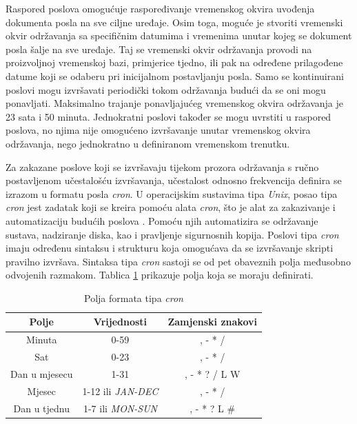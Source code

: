 Raspored poslova omogućuje raspoređivanje vremenskog okvira uvođenja dokumenta posla na sve ciljne uređaje. Osim toga, moguće je stvoriti vremenski okvir održavanja sa specifičnim datumima i vremenima unutar kojeg se dokument posla šalje na sve uređaje. Taj se vremenski okvir održavanja provodi na proizvoljnoj vremenskoj bazi, primjerice tjedno, ili pak na određene prilagođene datume koji se odaberu pri inicijalnom postavljanju posla. Samo se kontinuirani poslovi mogu izvršavati periodički tokom održavanja budući da se oni mogu ponavljati. Maksimalno trajanje ponavljajućeg vremenskog okvira održavanja je 23 sata i 50 minuta. Jednokratni poslovi također se mogu uvrstiti u raspored poslova, no njima nije omogućeno izvršavanje unutar vremenskog okvira održavanja, nego jednokratno u definiranom vremenskom trenutku. 

Za zakazane poslove koji se izvršavaju tijekom prozora održavanja s ručno postavljenom učestalošću izvršavanja, učestalost odnosno frekvencija definira se izrazom u formatu posla \textit{cron}. U operacijskim sustavima tipa \textit{Unix}, posao tipa \textit{cron} jest zadatak koji se kreira pomoću alata \textit{cron}, što je alat za zakazivanje i automatizaciju budućih poslova \cite{cron}. Pomoću njih automatizira se održavanje sustava, nadziranje diska, kao i pravljenje sigurnosnih kopija. Poslovi tipa \textit{cron} imaju određenu sintaksu i strukturu koja omogućava da se izvršavanje skripti pravilno izvršava. Sintaksa tipa \textit{cron} sastoji se od pet obaveznih polja međusobno odvojenih razmakom. Tablica \ref{table:cron} prikazuje polja koja se moraju definirati. 

\begin{table}[ht!]
	\centering
	\small
	\caption{Polja formata tipa \textit{cron} \cite{aws_docs}}
	\begin{tabular}{|c| c| c|}
		\hline
		\rowcolor{lightblue}  
		\textbf{Polje} & \textbf{Vrijednosti} & \textbf{Zamjenski znakovi} \\ \hline
		Minuta & 0-59 & , - * / \\ \hline
		Sat & 0-23 & , - * / \\ \hline
		Dan u mjesecu & 1-31 & , - * ? / L W \\ \hline
		Mjesec & 1-12 ili \textit{JAN-DEC} & , - * / \\ \hline
		Dan u tjednu & 1-7 ili \textit{MON-SUN} & , - * ? L \# \\ \hline
	\end{tabular}
	\label{table:cron}
\end{table}

